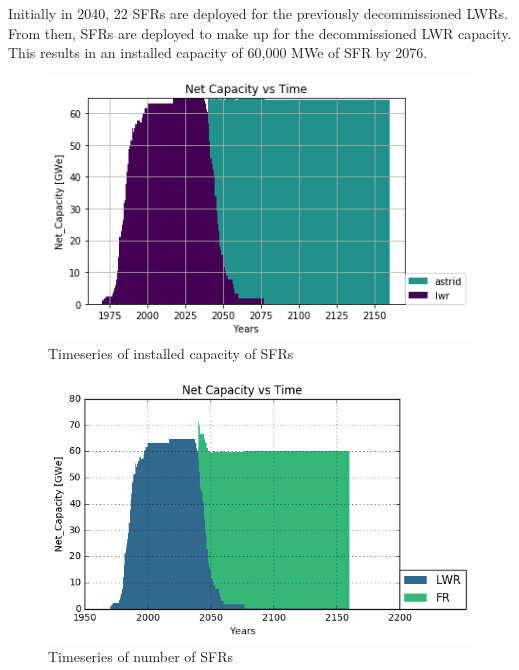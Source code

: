 Initially in 2040, 22 \gls{SFR}s
are deployed for the previously decommissioned
\gls{LWR}s. From then, \glspl{SFR} are deployed to
make up for the decommissioned \gls{LWR} capacity.
This results in an installed capacity of 60,000 MWe
of \gls{SFR} by 2076.

\begin{figure}[htbp!]
        \begin{center}
                \includegraphics[scale=0.7]{./images/french-transition/power_plot.png}
        \end{center}
        \caption{Timeseries of installed capacity of \gls{SFR}s}
        \label{fig:sfr_cap}
\end{figure}


\begin{figure}[htbp!]
        \begin{center}
                \includegraphics[scale=0.7]{./images/french-transition/number_plot.png}
        \end{center}
        \caption{Timeseries of number of \gls{SFR}s}
        \label{fig:sfr_num}
\end{figure}


